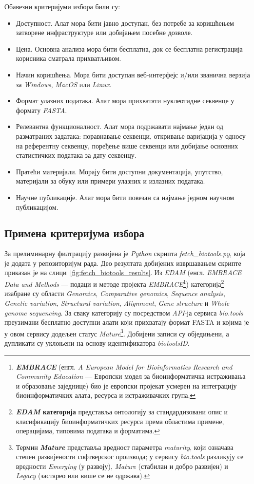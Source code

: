\documentclass[12pt,oneside]{memoir}
\begin{document}
Обавезни критеријуми избора били су:
\begin{itemize}
    \item Доступност. Алат мора бити јавно доступан, без потребе за коришћењем затворене инфраструктуре или добијањем посебне дозволе.
    \item Цена. Основна анализа мора бити бесплатна, док се бесплатна регистрација корисника сматрала прихватљивом.
    \item Начин коришћења. Мора бити доступан веб-интерфејс и/или званична верзија за \textit{Windows}, \textit{MacOS} или \textit{Linux}.
    \item Формат улазних података. Алат мора прихватати нуклеотидне секвенце у формату \textit{FASTA}.
    \item Релевантна функционалност. Алат мора подржавати најмање један од разматраних задатака: поравнавање секвенци, откривање варијација у односу на референтну секвенцу, поређење више секвенци или добијање основних статистичких података за дату секвенцу.
    \item Пратећи материјали. Морају бити доступни документација, упутство, материјали за обуку или примери улазних и излазних података.
    \item Научне публикације. Алат мора бити повезан са најмање једном научном публикацијом.
\end{itemize}


\subsection{Примена критеријума избора}
За прелиминарну филтрацију развијена је \textit{Python} скрипта \textit{fetch\_biotools.py}, која је додата у репозиторијум рада. Део резултата добијених извршавањем скрипте приказан је на слици~\ref{fig:fetch_biotools_results}. Из \textit{EDAM} (енгл. \textit{EMBRACE Data and Methods} — подаци и методе пројекта \textit{EMBRACE}\footnote{\textbf{\textit{EMBRACE}} (енгл. \textit{A European Model for Bioinformatics Research and Community Education} — Европски модел за биоинформатичка истраживања и образовање заједнице) био је европски пројекат усмерен на интеграцију биоинформатичких алата, ресурса и истраживачких група.})  категорија\footnote{\textbf{\textit{EDAM} категорија} представља онтологију за стандардизовани опис и класификацију биоинформатичких ресурса према областима примене, операцијама, типовима података и форматима.} изабране су области \textit{Genomics}, \textit{Comparative genomics}, \textit{Sequence analysis}, \textit{Genetic variation}, \textit{Structural variation}, \textit{Alignment}, \textit{Gene structure} и \textit{Whole genome sequencing}. За сваку категорију су посредством \textit{API}-ја сервиса \textit{bio.tools} преузимани бесплатно доступни алати који прихватају формат FASTA и којима је у овом сервису додељен статус \textit{Mature}\footnote{Термин \textbf{\textit{Mature}} представља вредност параметра \textit{maturity}, који означава степен развијености софтверског производа; у сервису \textit{bio.tools} разликују се вредности \textit{Emerging} (у развоју), \textit{Mature} (стабилан и добро развијен) и \textit{Legacy} (застарео или више се не одржава).}. Добијени записи су обједињени, а дупликати су уклоњени на основу идентификатора \textit{biotoolsID}.
\end{document}

